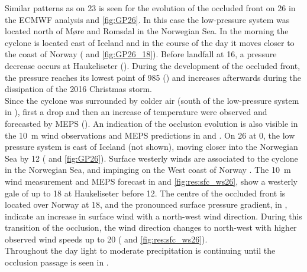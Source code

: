 Similar patterns as on \SI{23}{\dec} is seen for the evolution of the occluded front on \SI{26}{\dec} in the ECMWF analysis  and \ref{fig:GP26}. In this case the low-pressure system was located north of Møre and Romsdal in the Norwegian Sea. In the morning the cyclone is located east of Iceland and in the course of the day it moves closer to the coast of Norway ( and \ref{fig:GP26_18}). Before landfall at \SI{16}{\UTC}, a pressure decrease occurs at Haukeliseter (). During the development of the occluded front, the pressure reaches its lowest point of \SI{985}{\hPa} () and increases afterwards during the dissipation of the 2016 Christmas storm. 
\\
Since the cyclone was surrounded by colder air (south of the low-pressure system in ), first a drop and then an increase of temperature were observed and forecasted by MEPS (). An indication of the occlusion evolution is also visible in the \SI{10}{\metre} wind observations and MEPS predictions in  and . 
On \SI{26}{\dec} at \SI{0}{\UTC}, the low pressure system is east of Iceland (not shown), moving closer into the Norwegian Sea by \SI{12}{\UTC} ( and \ref{fig:GP26}). 
Surface westerly winds are associated to the cyclone in the Norwegian Sea, and impinging on the West coast of Norway . The \SI{10}{\metre} wind measurement and MEPS forecast in  and \ref{fig:res:sfc_ws26}, show a westerly gale of up to \SI{18}{\mPs} at Haukeliseter before \SI{12}{\UTC}.
The centre of the occluded front is located over Norway at \SI{18}{\UTC}, and the pronounced surface pressure gradient, in , indicate an increase in surface wind with a north-west wind direction. During this transition of the occlusion, the wind direction changes to north-west with higher observed wind speeds up to \SI{20}{\mPs} ( and \ref{fig:res:sfc_ws26}). 
\\
Throughout the day light to moderate precipitation is continuing until the occlusion passage is seen in .
